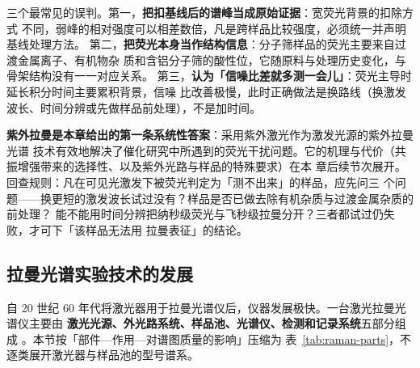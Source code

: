 \begin{pitfall}
三个最常见的误判。第一，\textbf{把扣基线后的谱峰当成原始证据}：宽荧光背景的扣除方式
不同，弱峰的相对强度可以相差数倍，凡是跨样品比较强度，必须统一并声明基线处理方法。
第二，\textbf{把荧光本身当作结构信息}：分子筛样品的荧光主要来自过渡金属离子、有机物杂
质和含铝分子筛的酸性位，它随原料与处理历史变化，与骨架结构没有一一对应关系。
第三，\textbf{认为「信噪比差就多测一会儿」}：荧光主导时延长积分时间主要累积背景，信噪
比改善极慢，此时正确做法是换路线（换激发波长、时间分辨或先做样品前处理），不是加时间。
\end{pitfall}

\begin{crosscheck}
\textbf{紫外拉曼是本章给出的第一条系统性答案}：采用紫外激光作为激发光源的紫外拉曼光谱
技术有效地解决了催化研究中所遇到的荧光干扰问题。它的机理与代价（共振增强带来的选择性、以及紫外光路与样品的特殊要求）在本
章后续节次展开。回查规则：凡在可见光激发下被荧光判定为「测不出来」的样品，应先问三
个问题——换更短的激发波长试过没有？样品是否已做去除有机杂质与过渡金属杂质的前处理？
能不能用时间分辨把纳秒级荧光与飞秒级拉曼分开？三者都试过仍失败，才可下「该样品无法用
拉曼表征」的结论。
\end{crosscheck}

\subsection{拉曼光谱实验技术的发展}

自 20 世纪 60 年代将激光器用于拉曼光谱仪后，仪器发展极快。一台激光拉曼光谱仪主要由
\textbf{激光光源、外光路系统、样品池、光谱仪、检测和记录系统}五部分组成
。本节按「部件—作用—对谱图质量的影响」压缩为
表~\ref{tab:raman-parts}，不逐类展开激光器与样品池的型号谱系。

